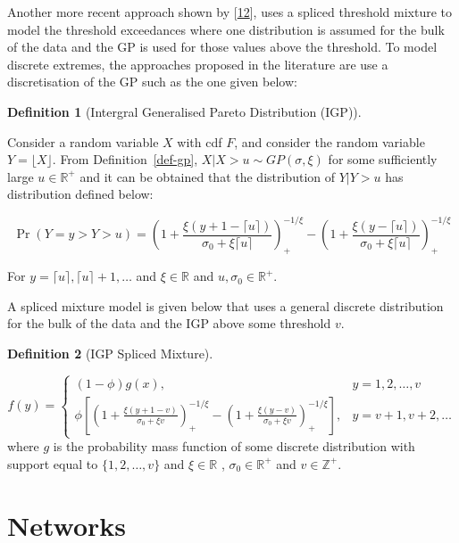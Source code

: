 \documentclass[
  10pt,
  a4paper,
]{scrreprt}
\theoremstyle{plain}
\theoremstyle{definition}
\newtheorem{definition}{Definition}[section]
\theoremstyle{plain}
\theoremstyle{remark}
\begin{document}
{Another more recent approach shown by
{[}\protect\hyperlink{ref-mac2012}{12}{]}, uses a spliced threshold
mixture to model the threshold exceedances where one distribution is
assumed for the bulk of the data and the GP is used for those values
above the threshold. To model discrete extremes, the approaches proposed
in the literature are use a discretisation of the GP such as the one
given below:

\begin{definition}[Intergral Generalised Pareto Distribution
(IGP)]\protect\hypertarget{def-igp}{}\label{def-igp}

Consider a random variable \(X\) with cdf \(F\), and consider the random
variable \(Y=\lfloor X \rfloor\). From Definition~\ref{def-gp},
\(X|X>u \sim GP(\sigma, \xi)\) for some sufficiently large
\(u\in \mathbb R^+\) and it can be obtained that the distribution of
\(Y|Y>u\) has distribution defined below:

\[
\Pr(Y=y>Y>u) = \left(1+\displaystyle\frac{\xi(y+1-\lceil u\rceil)}{\sigma_0+\xi\lceil u\rceil}\right)_+^{-1/\xi}-\left(1+\displaystyle\frac{\xi(y-\lceil u\rceil)}{\sigma_0+\xi\lceil u\rceil}\right)_+^{-1/\xi}
\]

For \(y=\lceil u\rceil,\lceil u\rceil+1, \ldots\) and
\(\xi \in \mathbb R\) and \(u, \sigma_0 \in \mathbb R^+.\)

\end{definition}

A spliced mixture model is given below that uses a general discrete
distribution for the bulk of the data and the IGP above some threshold
\(v\).

\begin{definition}[IGP Spliced
Mixture]\protect\hypertarget{def-mixigp}{}\label{def-mixigp}

\[
f(y) = \begin{cases}
(1-\phi)g(x), & y=1,2,\ldots, v\\
\phi\left[\left(1+\displaystyle\frac{\xi(y+1-v)}{\sigma_0+\xi v}\right)_+^{-1/\xi}-\left(1+\displaystyle\frac{\xi(y-v)}{\sigma_0+\xi v}\right)_+^{-1/\xi}\right],&y=v+1, v+2,\ldots
\end{cases}
\] where \(g\) is the probability mass function of some discrete
distribution with support equal to \(\{1,2,\ldots,v\}\) and
\(\xi \in \mathbb R\) , \(\sigma_0 \in \mathbb R^+\) and
\(v\in\mathbb Z^+.\)

\end{definition}

\hypertarget{sec-net}{%
\chapter{Networks}\label{sec-net}}

}
\end{document}
